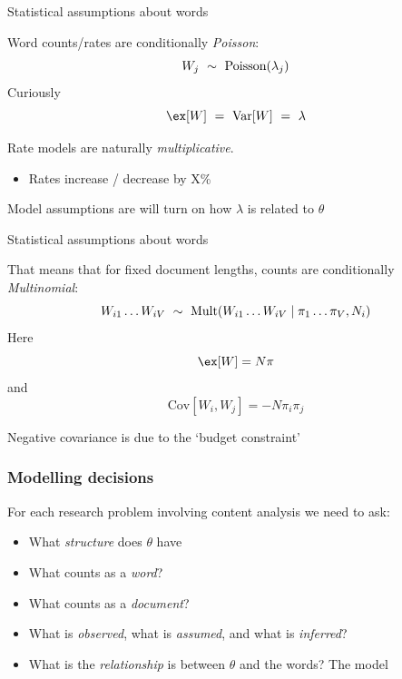 \documentclass{hertieteaching}\usepackage[]{graphicx}\usepackage[]{color}
\begin{document}
\begin{frame}{Statistical assumptions about words}

Word counts/rates are conditionally \textit{Poisson}:
$$
W_j ~\sim~ \text{Poisson}(\textcolor{black}{\lambda_{j}})
$$
Curiously
$$
\ex[W]  ~=~ \text{Var}[W] ~=~ \lambda
$$

Rate models are naturally \textit{multiplicative}.
\begin{itemize}
  \item Rates increase / decrease by X\%
\end{itemize}

Model assumptions are will turn on how $\lambda$ is
related to $\theta$

\end{frame}

%
%
%

\begin{frame}{Statistical assumptions about words}

That means that for fixed document lengths, counts are conditionally \textit{Multinomial}:
$$
W_{i1}\ldots W_{iV} ~\sim~ \text{Mult}(W_{i1}\ldots W_{iV} \mid \textcolor{black}{\pi_{1}}\ldots\textcolor{black}{\pi_{V}}, N_i)
$$
Here
$$
\ex[W] = N\pi
$$
and
$$
\text{Cov}[W_{i}, W_{j}] = -N \pi_{i}\pi_{j}
$$

Negative covariance is due to the `budget constraint'
\end{frame}

\begin{frame}\frametitle{Modelling decisions}

For each research problem involving content analysis we need to ask:
\begin{itemize}
\item What \textit{structure} does $\theta$ have
\item What counts as a \textit{word}?
\item What counts as a \textit{document}?
\item What is \textit{observed}, what is \textit{assumed}, and what is \textit{inferred}?
\item What is the \textit{relationship} is between $\theta$ and the words? The model
\end{itemize}

\end{frame}
\end{document}

